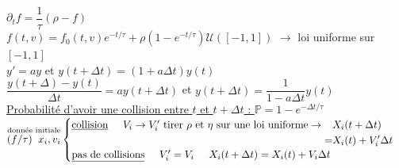 \documentclass[12pt,a4paper]{article}
\begin{document}
$\partial_t f = \dfrac1\tau (\rho-f)$\\
$f(t,v) = f_0(t,v)e^{-t/\tau} + \rho (1-e^{-t/\tau})\mathcal U \left([-1, 1]\right)$ $\to$ loi uniforme sur $[-1,1]$\\

$y' = ay$ et $y(t+\Delta t) = (1+a \Delta t)y(t)$\\
$\dfrac{y(t+\Delta)-y(t)}{\Delta t} = a y(t+\Delta t)$ et $y(t+\Delta t) = \dfrac1{1-a\Delta t} y(t)$\\

\underline{Probabilité d'avoir une collision entre $t$ et $t+\Delta t$ : } $\mathbb P = 1-e^{-\Delta t/\tau}$\\

$\overset{\text{donnée initiale}}{(f/\tau) \hspace{.2cm} x_i,v_i} \begin{cases}
	\text{\underline{collision}} \hspace{.5cm} V_i \to V_i' \text{ tirer $\rho$ et $\eta$ sur une loi uniforme} \to \begin{aligned}[t]
		&X_i(t+\Delta t)\\
		=&X_i(t) + V_i'\Delta t
	\end{aligned}\\
	\text{\underline{pas de collisions}} \hspace{.5cm} V_i'=V_i \hspace{.5cm} X_i(t+\Delta t) = X_i(t) + V_i\Delta t	
\end{cases}$

	
	
	
\end{document}
